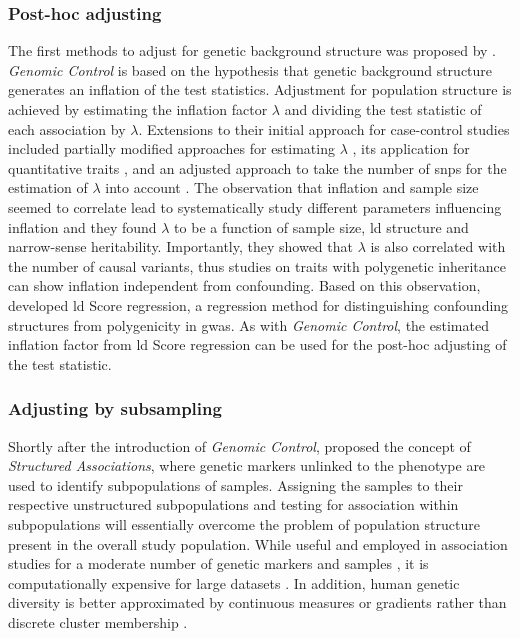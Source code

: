 \subsubsection{Post-hoc adjusting}
The first methods to adjust for genetic background structure was proposed by \citet{Devlin1999}. \textit{Genomic Control} is based on the hypothesis that genetic background structure generates an inflation of the test statistics. Adjustment for population structure is achieved by estimating the inflation factor \(\lambda\) and dividing the test statistic of each association by \(\lambda\). Extensions to their initial approach for case-control studies included partially modified approaches for estimating \(\lambda\) \citep{Reich2001}, its application for quantitative traits \citep{Bacanu2002}, and an adjusted approach to take the number of \glspl{snp} for the estimation of \(\lambda\) into account \citep{Devlin2004}. The observation that inflation and sample size seemed to correlate lead \citet{Yang2011} to systematically study different parameters influencing inflation and they found \(\lambda\) to be a function of sample size, \gls{ld} structure and narrow-sense heritability. Importantly, they showed that \(\lambda\) is also correlated with the number of causal variants, thus studies on traits with polygenetic inheritance can show inflation independent from confounding. Based on this observation, \citet{Bulik-Sullivan2015} developed \gls{ld} Score regression, a regression method for distinguishing confounding structures from polygenicity in \gls{gwas}. As with \textit{Genomic Control}, the estimated inflation factor from \gls{ld} Score regression can be used for the post-hoc adjusting of the test statistic. 
\subsubsection{Adjusting by subsampling}
Shortly after the introduction of \textit{Genomic Control}, \citet{Pritchard2000} proposed the concept of \textit{Structured Associations}, where genetic markers unlinked to the phenotype are used to identify subpopulations of samples. Assigning the samples to their respective unstructured subpopulations and testing for association within subpopulations will essentially overcome the problem of population structure present in the overall study population. While useful and employed in association studies for a moderate number of genetic markers and samples \citep{Li2004,Stein2009,Kulbrock2013}, it is computationally expensive for large datasets \citep{Price2006}. In addition, human genetic diversity is better approximated by continuous measures or gradients rather than discrete cluster membership \citep{Serre2004,Price2006}.

